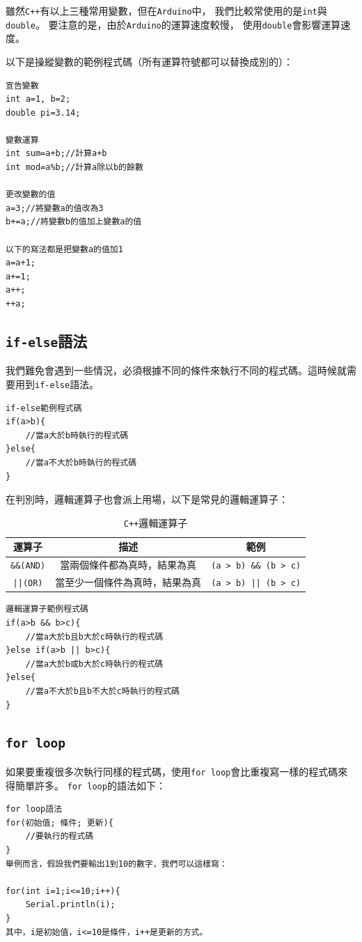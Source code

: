 \documentclass[12pt,a4paper]{article}
\begin{document}
雖然\texttt{C++}有以上三種常用變數，但在\texttt{Arduino}中，
我們比較常使用的是\texttt{int}與\texttt{double}。
要注意的是，由於\texttt{Arduino}的運算速度較慢，
使用\texttt{double}會影響運算速度。

以下是操縱變數的範例程式碼（所有運算符號都可以替換成別的）：

\begin{lstlisting}
宣告變數
int a=1, b=2;
double pi=3.14;

變數運算
int sum=a+b;//計算a+b
int mod=a%b;//計算a除以b的餘數

更改變數的值
a=3;//將變數a的值改為3
b+=a;//將變數b的值加上變數a的值

以下的寫法都是把變數a的值加1
a=a+1;
a+=1;
a++;
++a;
\end{lstlisting}
    
\subsection{\texttt{if-else}語法}
我們難免會遇到一些情況，必須根據不同的條件來執行不同的程式碼。這時候就需要用到\texttt{if-else}語法。


\begin{lstlisting}
if-else範例程式碼
if(a>b){
    //當a大於b時執行的程式碼
}else{
    //當a不大於b時執行的程式碼
}
\end{lstlisting}

在判別時，邏輯運算子也會派上用場，以下是常見的邏輯運算子：
\begin{table}[h!]
\centering
\begin{tabular}{|c|c|c|}
\hline
\textbf{運算子} & \textbf{描述} & \textbf{範例} \\ \hline
\texttt{\&\&(AND)}  & 當兩個條件都為真時，結果為真 & \texttt{(a > b) \&\& (b > c)} \\ \hline
\texttt{||(OR)}  & 當至少一個條件為真時，結果為真 & \texttt{(a > b) || (b > c)} \\ \hline
\end{tabular}
\caption{\texttt{C++}邏輯運算子}
\label{tab:logical_bitwise_operators}
\end{table}

\begin{lstlisting}
邏輯運算子範例程式碼
if(a>b && b>c){
    //當a大於b且b大於c時執行的程式碼
}else if(a>b || b>c){
    //當a大於b或b大於c時執行的程式碼
}else{
    //當a不大於b且b不大於c時執行的程式碼
}
\end{lstlisting}

\subsection{\texttt{for loop}}
如果要重複很多次執行同樣的程式碼，使用\texttt{for loop}會比重複寫一樣的程式碼來得簡單許多。
\texttt{for loop}的語法如下：
\begin{lstlisting}
for loop語法
for(初始值; 條件; 更新){
    //要執行的程式碼
}
舉例而言，假設我們要輸出1到10的數字，我們可以這樣寫：

for(int i=1;i<=10;i++){
    Serial.println(i);
}
其中，i是初始值，i<=10是條件，i++是更新的方式。
\end{lstlisting}
\end{document}
